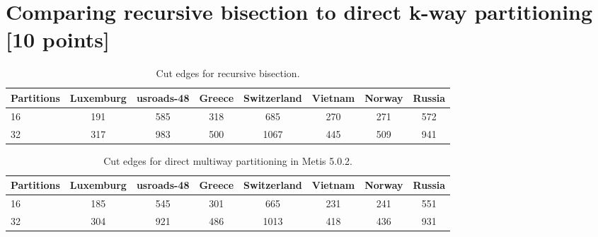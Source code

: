 \section{Comparing recursive bisection to direct k-way partitioning [10 points]}

\begin{table}[H]
	\centering
	\begin{tabular}{lccccccc} %
		\toprule
		Partitions & Luxemburg & usroads-48 & Greece & Switzerland & Vietnam & Norway & Russia \\
		\midrule
		16         & 191       & 585        & 318    & 685         & 270     & 271    & 572    \\
		32         & 317       & 983        & 500    & 1067        & 445     & 509    & 941    \\
		\bottomrule
	\end{tabular}
	\caption{Cut edges for recursive bisection.}
	\label{tab:partitions_rec}
\end{table}

\begin{table}[H]
	\centering
	\begin{tabular}{lccccccc} %
		\toprule
		Partitions & Luxemburg & usroads-48 & Greece & Switzerland & Vietnam & Norway & Russia \\
		\midrule
		16         & 185       & 545        & 301    & 665         & 231     & 241    & 551    \\
		32         & 304       & 921        & 486    & 1013        & 418     & 436    & 931    \\
		\bottomrule
	\end{tabular}
	\caption{Cut edges for direct multiway partitioning in Metis 5.0.2.}
	\label{tab:partitions_k_way}
\end{table}

